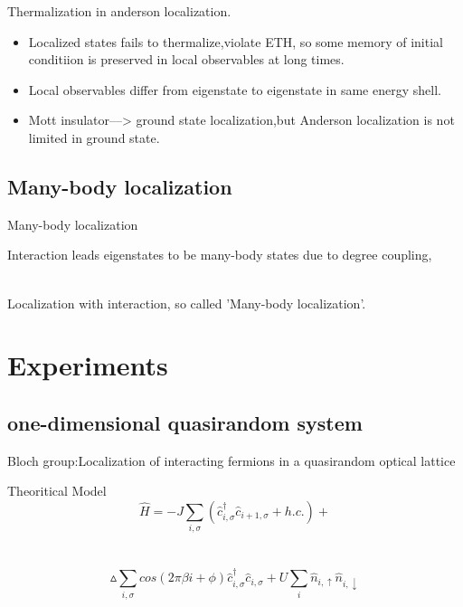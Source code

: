 \documentclass{beamer}
\begin{document}
\begin{frame}
Thermalization in anderson localization.

\begin{itemize}

\item Localized states fails to thermalize,violate ETH, so some memory of initial conditiion is preserved in local observables at long times. 

\pause \item Local observables differ from eigenstate to eigenstate in same energy shell. 

\pause \item Mott insulator—> ground state localization,but Anderson localization is not limited in ground state.

\end{itemize}

\end{frame}
\subsection{Many-body localization}
\begin{frame}{Many-body localization}

Interaction leads eigenstates to be many-body states due to degree coupling,\\~

Localization with interaction, so called 'Many-body localization'.

\end{frame}
\section{Experiments}
\subsection{one-dimensional quasirandom system}
\begin{frame}
Bloch group:Localization of interacting fermions in a quasirandom optical lattice
\begin{block}{Theoritical Model}
$$\hat{H}=-J\sum_{i,\sigma}(\hat{c}_{i,\sigma}^{\dagger}\hat{c}_{i+1,\sigma}+h.c.)+$$\\~
$$\vartriangle \sum_{i,\sigma}cos(2\pi\beta i+\phi)\hat{c}_{i,\sigma}^{\dagger}\hat{c}_{i,\sigma}+U\sum_{i}\hat{n}_{i,\uparrow}\hat{n}_{i,\downarrow}$$
\end{block}
\end{frame}
\end{document}
